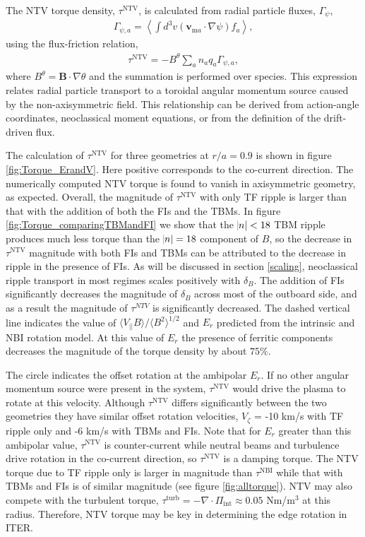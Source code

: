 \documentclass[aip, pop, preprint]{revtex4-1}
\numberwithin{figure}{section}
\numberwithin{equation}{section}
\begin{document}
The NTV torque density, $\tau^{\text{NTV}}$, is calculated from radial particle fluxes, $\Gamma_{\psi}$, 
\begin{gather}
\Gamma_{\psi,a} = \left \langle \int d^3v (\bm{v}_{\text{m}a} \cdot \nabla \psi) f_a \right \rangle,
\label{eq:particleflux}
\end{gather}
using the flux-friction relation,
\begin{gather}
\tau^{\text{NTV}} = - B^{\theta} \sum_a n_a q_a \Gamma_{\psi, a},
\end{gather}
where $B^{\theta} = \bm{B} \cdot \nabla \theta$ and the summation is performed over species. This expression relates radial particle transport to a toroidal angular momentum source caused by the non-axisymmetric field. This relationship can be derived from action-angle coordinates,\cite{Albert2016} neoclassical moment equations,\cite{Shaing1986} or from the definition of the drift-driven flux.\cite{Shaing2006} 

The calculation of $\tau^{\text{NTV}}$ for three geometries at $r/a = 0.9$ is shown in figure \ref{fig:Torque_ErandV}. Here positive corresponds to the co-current direction. The numerically computed NTV torque is found to vanish in axisymmetric geometry, as expected. Overall, the magnitude of $\tau^{\text{NTV}}$ with only TF ripple is larger than that with the addition of both the FIs and the TBMs.  In figure \ref{fig:Torque_comparingTBMandFI} we show that the $\abs{n} < 18$ TBM  ripple produces much less torque than the $\abs{n} = 18$ component of $B$, so the decrease in $\tau^{\text{NTV}}$ magnitude with both FIs and TBMs can be attributed to the decrease in ripple in the presence of FIs. As will be discussed in section \ref{scaling}, neoclassical ripple transport in most regimes scales positively with $\delta_B$. The addition of FIs significantly decreases the magnitude of $\delta_B$ across most of the outboard side, and as a result the magnitude of $\tau^{NTV}$ is significantly decreased. The dashed vertical line indicates the value of $\langle V_{||} B\rangle/\langle B^2 \rangle^{1/2}$ and $E_r$ predicted from the intrinsic and NBI rotation model. At this value of $E_r$ the presence of ferritic components decreases the magnitude of the torque density by about $75\%$. 

The circle indicates the offset rotation at the ambipolar $E_r$. If no other angular momentum source were present in the system, $\tau^{\text{NTV}}$ would drive the plasma to rotate at this velocity. Although $\tau^{\text{NTV}}$ differs significantly between the two geometries they have similar offset rotation velocities, $V_{\zeta}$ = -10 km/s with TF ripple only and -6 km/s with TBMs and FIs. Note that for $E_r$ greater than this ambipolar value, $\tau^{\text{NTV}}$ is counter-current while neutral beams and turbulence drive rotation in the co-current direction, so $\tau^{\text{NTV}}$ is a damping torque. The NTV torque due to TF ripple only is larger in magnitude than $\tau^{\text{NBI}}$ while that with TBMs and FIs is of similar magnitude (see figure \ref{fig:alltorque}). NTV may also compete with the turbulent torque, $\tau^{\text{turb}} = - \nabla \cdot \Pi_{\text{int}} \approx 0.05$ Nm/m$^3$ at this radius. Therefore, NTV torque may be key in determining the edge rotation in ITER. 
\end{document}
